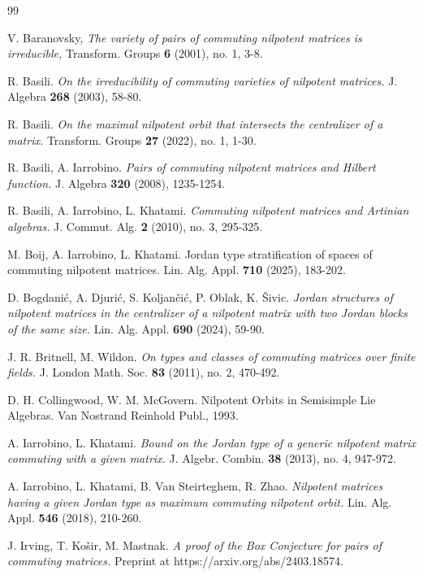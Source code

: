 \documentclass[11pt]{amsproc}
\begin{document}



\begin{thebibliography}{99}


V. Baranovsky, 
\emph{The variety of pairs of commuting nilpotent matrices is irreducible,}
Transform. Groups \textbf{6} (2001), no. 1, 3-8.

R. Basili. 
\emph{On the irreducibility of commuting varieties of nilpotent matrices.} J. Algebra \textbf{268} (2003), 58-80.

R. Basili. \emph{On the maximal nilpotent orbit that intersects the centralizer of a matrix.}
Transform. Groups  \textbf{27} (2022), no. 1, 1-30.

R. Basili, A. Iarrobino. 
\emph{Pairs of commuting nilpotent matrices and Hilbert function.}
J. Algebra \textbf{320} (2008), 1235-1254.

R. Basili, A. Iarrobino, L. Khatami.
\emph{Commuting nilpotent matrices and Artinian algebras.}
J. Commut. Alg.  \textbf{2} (2010), no. 3, 295-325.

M. Boij, A. Iarrobino, L. Khatami.
Jordan type stratification of spaces of commuting nilpotent matrices.
Lin. Alg. Appl. \textbf{710} (2025), 183-202.

D. Bogdani\'c, A. Djuri\'c, S. Koljan\v ci\'c, P. Oblak, K. \v Sivic.
\emph{Jordan structures of nilpotent matrices in the centralizer of a nilpotent matrix with two Jordan blocks of the same size.}
Lin. Alg. Appl. \textbf{690} (2024), 59-90.

J. R. Britnell, M. Wildon.
\emph{On types and classes of commuting matrices over finite fields.} 
J. London Math. Soc. \textbf{83} (2011), no. 2, 470-492.

D. H. Collingwood, W. M. McGovern.
Nilpotent Orbits in Semisimple Lie Algebras.
Van Nostrand Reinhold Publ., 1993.

A. Iarrobino, L. Khatami. 
\emph{Bound on the Jordan type of a generic nilpotent matrix commuting with a given matrix.} J. Algebr. Combin. \textbf{38} (2013), no. 4, 947-972.

A. Iarrobino, L. Khatami, B. Van Steirteghem, R. Zhao.
\emph{Nilpotent matrices having a given Jordan type as maximum commuting nilpotent orbit.}
Lin. Alg. Appl. \textbf{546} (2018), 210-260.

J. Irving, T. Ko\v{s}ir, M. Mastnak.
\emph{A proof of the Box Conjecture for pairs of commuting matrices.} 
Preprint at https://arxiv.org/abs/2403.18574.


\end{thebibliography}
\end{document}
